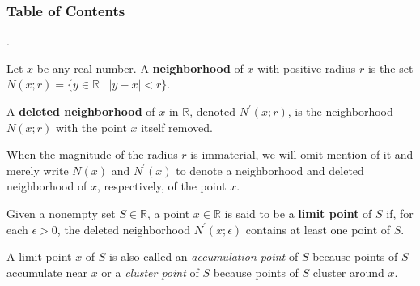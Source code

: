 \documentclass[8pt]{beamer}
\newcommand{\mbb}[1]{\mathbb{#1}}
\newcommand{\tb}[1]{\textbf{#1}}
\newcommand{\ti}[1]{\textit{#1}}
\newcommand{\abs}[1]{\left\lvert #1 \right\rvert}
\begin{document}
\begingroup
    \begin{frame}
        \frametitle{Table of Contents}
        \tableofcontents[currentsubsection]
    \end{frame}
\endgroup

\begin{frame}{.}
    \begin{definition}
        Let $x$ be any real number.
        A \tb{neighborhood} of $x$ with positive radius $r$ is the set $N(x;r) = \{y \in \mbb{R} \mid \abs{y-x} < r \}$.

        A \tb{deleted neighborhood} of $x$ in $\mbb{R}$, denoted $N^\prime (x;r)$, is the neighborhood $N(x;r)$ with the point $x$ itself removed.
    \end{definition}
    When the magnitude of the radius $r$ is immaterial, we will omit mention of it and merely write $N(x)$ and $N^\prime(x)$ to denote a neighborhood and deleted neighborhood of $x$, respectively, of the point $x$.

    \begin{definition}
        Given a nonempty set $S \in \mbb{R}$, a point $x \in \mbb{R}$ is said to be a \tb{limit point} of $S$ if, for each $\epsilon > 0$, the deleted neighborhood $N^\prime(x; \epsilon)$ contains at least one point of $S$.
    \end{definition}
    A limit point $x$ of $S$ is also called an \ti{accumulation point} of $S$ because points of $S$ accumulate near $x$ or a \ti{cluster point} of $S$ because points of $S$ cluster around $x$.
\end{frame}
\end{document}
